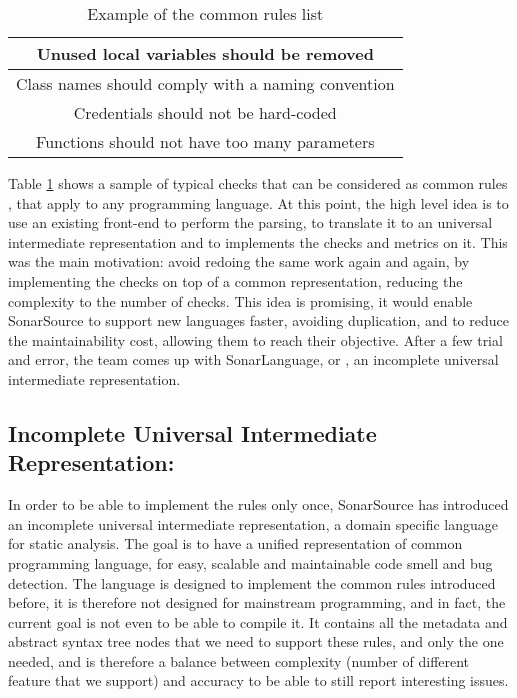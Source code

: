 \begin{table}[h]
\centering
\caption{Example of the common rules list}
\label{table:common_rules}
	\begin{tabular}{|c|}
		\hline
		Unused local variables should be removed  \\ \hline
		Class names should comply with a naming convention \\ \hline
		Credentials should not be hard-coded \\ \hline
		Functions should not have too many parameters \\ \hline
	\end{tabular}
\end{table}

Table \ref{table:common_rules} shows a sample of typical checks that can be considered as common rules \cite{JiraSonarSource:2019:Online}, that apply to any programming language.
At this point, the high level idea is to use an existing front-end to perform the parsing, to translate it to an universal intermediate representation and to implements the checks and metrics on it.
This was the main motivation: avoid redoing the same work again and again, by implementing the checks on top of a common representation, reducing the complexity to the number of checks.
This idea is promising, it would enable SonarSource to support new languages faster, avoiding duplication, and to reduce the maintainability cost, allowing them to reach their objective.
After a few trial and error, the team comes up with SonarLanguage, or \slang{}, an incomplete universal intermediate representation. 


\subsection{Incomplete Universal Intermediate Representation: \slang{}}
\label{subsec:slang}

In order to be able to implement the rules only once, SonarSource has introduced an incomplete universal intermediate representation, a domain specific language for static analysis. 
The goal is to have a unified representation of common programming language, for easy, scalable and maintainable code smell and bug detection. 
The language is designed to implement the common rules introduced before, it is therefore not designed for mainstream programming, and in fact, the current goal is not even to be able to compile it.
It contains all the metadata and abstract syntax tree nodes that we need to support these rules, and only the one needed, and is therefore a balance between complexity (number of different feature that we support) and accuracy to be able to still report interesting issues. 

